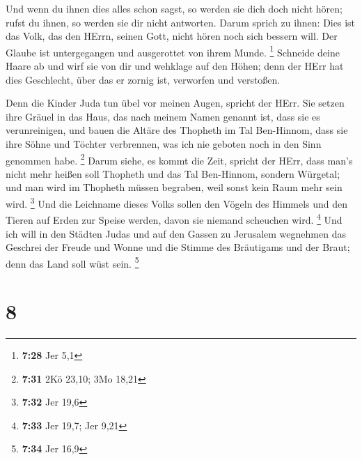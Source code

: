  Und wenn du ihnen dies alles schon sagst, so werden sie
dich doch nicht hören; rufst du ihnen, so werden sie dir nicht
antworten.  Darum sprich zu ihnen: Dies ist das Volk, das
den HErrn, seinen Gott, nicht hören noch sich bessern will. Der Glaube
ist untergegangen und ausgerottet von ihrem Munde. \footnote{\textbf{7:28}
  Jer 5,1}  Schneide deine Haare ab und wirf sie von dir
und wehklage auf den Höhen; denn der HErr hat dies Geschlecht, über das
er zornig ist, verworfen und verstoßen.

 Denn die Kinder Juda tun übel vor meinen Augen, spricht
der HErr. Sie setzen ihre Gräuel in das Haus, das nach meinem Namen
genannt ist, dass sie es verunreinigen,  und bauen die
Altäre des Thopheth im Tal Ben-Hinnom, dass sie ihre Söhne und Töchter
verbrennen, was ich nie geboten noch in den Sinn genommen habe.
\footnote{\textbf{7:31} 2Kö 23,10; 3Mo 18,21}  Darum siehe,
es kommt die Zeit, spricht der HErr, dass man's nicht mehr heißen soll
Thopheth und das Tal Ben-Hinnom, sondern Würgetal; und man wird im
Thopheth müssen begraben, weil sonst kein Raum mehr sein wird.
\footnote{\textbf{7:32} Jer 19,6}  Und die Leichname dieses
Volks sollen den Vögeln des Himmels und den Tieren auf Erden zur Speise
werden, davon sie niemand scheuchen wird. \footnote{\textbf{7:33} Jer
  19,7; Jer 9,21}  Und ich will in den Städten Judas und
auf den Gassen zu Jerusalem wegnehmen das Geschrei der Freude und Wonne
und die Stimme des Bräutigams und der Braut; denn das Land soll wüst
sein. \footnote{\textbf{7:34} Jer 16,9}

\hypertarget{section-2}{%
\section{8}\label{section-2}}

